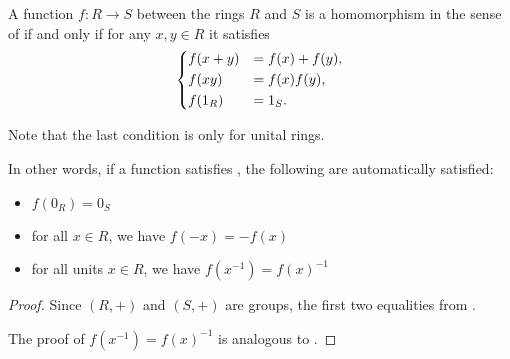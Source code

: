 \begin{proposition}\label{thm:ring_homomorphism_simpler_conditions}
  A function \( f: R \to S \) between the rings \( R \) and \( S \) is a homomorphism in the sense of  if and only if for any \( x, y \in R \) it satisfies
  \begin{equation}\label{thm:ring_homomorphism_simpler_conditions/condition}
    \begin{dcases}
      f(x + y) & = f(x) + f(y), \\
      f(xy)    & = f(x) f(y),   \\
      f(1_R)   & = 1_S.
    \end{dcases}
  \end{equation}

  Note that the last condition is only for unital rings.

  In other words, if a function satisfies , the following are automatically satisfied:
  \begin{itemize}
    \item \( f(0_R) = 0_S \)
    \item for all \( x \in R \), we have \( f(-x) = -f(x) \)
    \item for all units \( x \in R \), we have \( f(x^{-1}) = f(x)^{-1} \)
  \end{itemize}
\end{proposition}
\begin{proof}
  Since \( (R, +) \) and \( (S, +) \) are groups, the first two equalities from .

  The proof of \( f(x^{-1}) = f(x)^{-1} \) is analogous to .
\end{proof}

